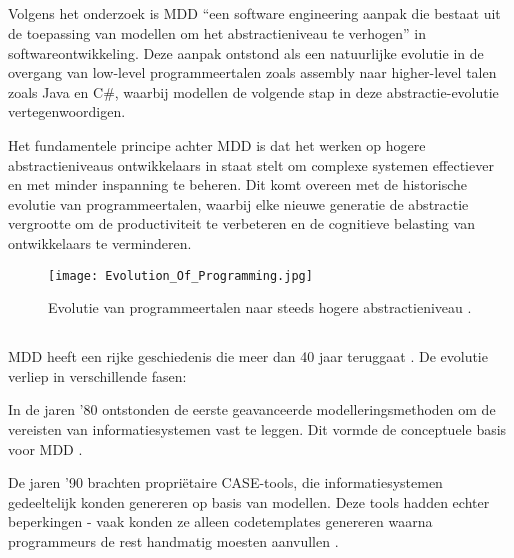 \subsection{}%

Volgens het onderzoek \textcite{Hailpern2006} is \gls{MDD} “een software engineering aanpak die bestaat uit de toepassing van modellen om het abstractieniveau te verhogen” in softwareontwikkeling. Deze aanpak ontstond als een natuurlijke evolutie in de overgang van low-level programmeertalen zoals assembly naar higher-level talen zoals Java en C\#, waarbij modellen de volgende stap in deze abstractie-evolutie vertegenwoordigen.

Het fundamentele principe achter \gls{MDD} is dat het werken op hogere abstractieniveaus ontwikkelaars in staat stelt om complexe systemen effectiever en met minder inspanning te beheren. Dit komt overeen met de historische evolutie van programmeertalen, waarbij elke nieuwe generatie de abstractie vergrootte om de productiviteit te verbeteren en de cognitieve belasting van ontwikkelaars te verminderen.

\begin{figure}[H]
    \centering
    \texttt{[image: Evolution\_Of\_Programming.jpg]}
    \caption[Evolution of programming]{\label{fig:evolution} Evolutie van programmeertalen naar steeds hogere abstractieniveau \autocite{Sufi_2023}.}
\end{figure}


\subsection{}%
\gls{MDD} heeft een rijke geschiedenis die meer dan 40 jaar teruggaat \autocite{Henkel2010}. De evolutie verliep in verschillende fasen:

In de jaren '80 ontstonden de eerste geavanceerde modelleringsmethoden om de vereisten van informatiesystemen vast te leggen. Dit vormde de conceptuele basis voor \gls{MDD} \autocite{Henkel2010}.

De jaren '90 brachten propriëtaire \gls{CASE}-tools, die informatiesystemen gedeeltelijk konden genereren op basis van modellen. Deze tools hadden echter beperkingen - vaak konden ze alleen codetemplates genereren waarna programmeurs de rest handmatig moesten aanvullen \autocite{Case_1985}.

